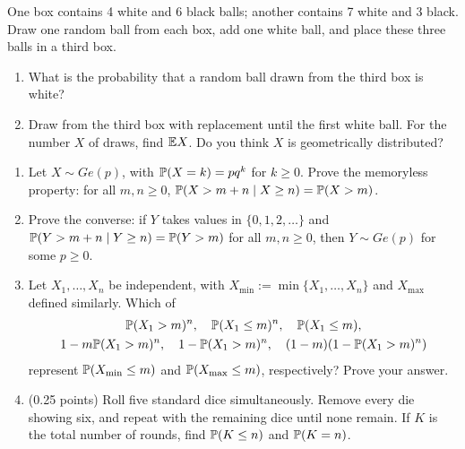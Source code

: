 \documentclass[a4paper]{report}
\begin{document}
\begin{problempencil}
One box contains 4 white and 6 black balls; another contains 7 white and 3 black. Draw one random ball from each box, add one white ball, and place these three balls in a third box.
\begin{enumerate}
\item What is the probability that a random ball drawn from the third box is white?
\item Draw from the third box with replacement until the first white ball. For the number $X$ of draws, find $\E X$. Do you think $X$ is geometrically distributed?
\end{enumerate}
\end{problempencil}
\begin{problempencil}[T1, SE 2023]
\begin{enumerate}
\item Let $X\sim Ge(p)$, with $\P(X=k)=pq^k$ for $k\ge0$. Prove the memoryless property: for all $m,n\ge0$, $\P(X>m+n\mid X\ge n)=\P(X>m)$.
\item Prove the converse: if $Y$ takes values in $\{0,1,2,\dots\}$ and $\P(Y>m+n\mid Y\ge n)=\P(Y>m)$ for all $m,n\ge0$, then $Y\sim Ge(p)$ for some $p\ge0$.
\item Let $X_1,\dots,X_n$ be independent, with $X_{\min}:=\min\{X_1,\dots,X_n\}$ and $X_{\max}$ defined similarly. Which of
\[\begin{gathered}
\P(X_1>m)^n,\quad\P(X_1\le m)^n,\quad\P(X_1\le m),\\
1-m\P(X_1>m)^n,\quad1-\P(X_1>m)^n,\quad(1-m)(1-\P(X_1>m)^n)
\end{gathered}\]
represent $\P(X_{\min}\le m)$ and $\P(X_{\max}\le m)$, respectively? Prove your answer.
\item (0.25 points) Roll five standard dice simultaneously. Remove every die showing six, and repeat with the remaining dice until none remain. If $K$ is the total number of rounds, find $\P(K\le n)$ and $\P(K=n)$.
\end{enumerate}
\end{problempencil}
\end{document}
